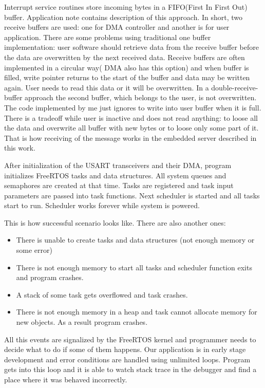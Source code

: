 Interrupt service routines store incoming bytes in a FIFO(First In First Out)
buffer. Application note \cite{stm_dma_fifo_appnote} contains description of
this approach. In short, two receive buffers are used: one for DMA controller
and another is for user application. There are some problems using traditional
one buffer implementation: user software should retrieve data from the
receive buffer before the data are overwritten by the next received data.
Receive buffers are often implemented in a circular way( DMA also has this
option) and when buffer is filled, write pointer returns to the start of the
buffer and data may be written again. User needs to read this data or it will be
overwritten. In a double-receive-buffer approach the second buffer, which
belongs to the user, is not overwritten. The code implemented by me just ignores
to write into user buffer when it is full. There is a tradeoff while user is
inactive and does not read anything: 
to loose all the data and overwrite all buffer with new bytes or to loose only
some part of it. That is how receiving of the message works in the embedded
server described in this work.

After initialization of the USART transceivers and their DMA, program initializes 
FreeRTOS tasks and data structures. All system queues and semaphores are created
at that time. Tasks are registered and task input parameters are passed into
task functions. Next scheduler is started and all tasks start to run. Scheduler
works forever while system is powered.

This is how successful scenario looks like. There are also another ones:
\begin{itemize}
  \item There is unable to create tasks and data structures (not enough memory
  or some error)
  \item There is not enough memory to start all tasks and scheduler function
  exits and program crashes.
  \item A stack of some task gets overflowed and task crashes.
  \item There is not enough memory in a heap and task cannot allocate memory
  for new objects. As a result program crashes.
\end{itemize}

All this events are signalized by the FreeRTOS kernel and programmer needs to
decide what to do if some of them happens. Our application is in early stage
development and error conditions are handled using unlimited loops.
Program gets into this loop and it is able to watch stack trace in the debugger
and find a place where it was behaved incorrectly.

